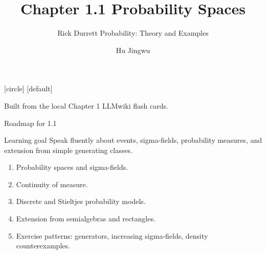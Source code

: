 [circle]
[default]

\usepackage{amsmath,amssymb,mathtools}
\usepackage{booktabs}

\newcommand{\OmegaSpace}{\Omega}
\newcommand{\F}{\mathcal{F}}
\newcommand{\A}{\mathcal{A}}
\newcommand{\B}{\mathcal{B}}
\newcommand{\C}{\mathcal{C}}
\newcommand{\Sclass}{\mathcal{S}}
\newcommand{\R}{\mathbb{R}}
\newcommand{\N}{\mathbb{N}}
\newcommand{\Q}{\mathbb{Q}}
\newcommand{\Prob}{\mathbb{P}}
\newcommand{\one}{\mathbf{1}}
\newcommand{\vikiname}[1]{\par\smallskip{\scriptsize\color{blue!60!black}\textbf{LLMwiki:} \texttt{\detokenize{#1}}}}
\newcommand{\blankproof}{%
  \vspace{2mm}
  {\color{gray!55}\rule{\linewidth}{0.4pt}}\par\vspace{7mm}
  {\color{gray!55}\rule{\linewidth}{0.4pt}}\par\vspace{7mm}
  {\color{gray!55}\rule{\linewidth}{0.4pt}}\par\vspace{7mm}
  {\color{gray!55}\rule{\linewidth}{0.4pt}}\par
}
\newcommand{\proofblock}[1]{\ifteacher #1 \else \blankproof \fi}

\title[Chapter 1.1]{Chapter 1.1 Probability Spaces}
\subtitle{Rick Durrett Probability: Theory and Examples}
\author{Hu Jingwu}
\date{}



\begin{frame}
  \titlepage
  \vspace{-5mm}
  \begin{center}
    \small Built from the local Chapter 1 LLMwiki flash cards.
  \end{center}
\end{frame}

\begin{frame}{Roadmap for 1.1}
  \begin{block}{Learning goal}
    Speak fluently about events, sigma-fields, probability measures, and extension from simple generating classes.
  \end{block}
  \begin{enumerate}
    \item Probability spaces and sigma-fields.
    \item Continuity of measure.
    \item Discrete and Stieltjes probability models.
    \item Extension from semialgebras and rectangles.
    \item Exercise patterns: generators, increasing sigma-fields, density counterexamples.
  \end{enumerate}
\end{frame}

